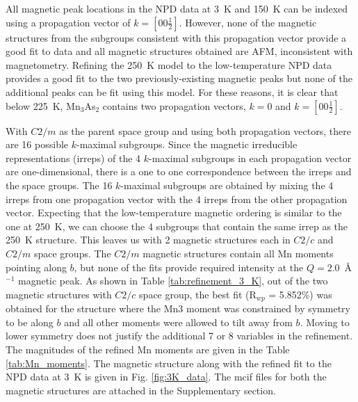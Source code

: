 \documentclass[letterpaper,10pt,doublespacing,edeposit]{uiucthesis2020}
\begin{document}
\begin{mainmatter}
All magnetic peak locations in the NPD data at 3~K and 150~K can be indexed using a propagation vector of $k = [00\frac{1}{2}]$. However, none of the magnetic structures from the subgroups consistent with this propagation vector provide a good fit to data and all magnetic structures obtained are AFM, inconsistent with magnetometry. Refining the 250~K model to the low-temperature NPD data provides a good fit to the two previously-existing magnetic peaks but none of the additional peaks can be fit using this model. For these reasons, it is clear that below 225~K, Mn$_3$As$_2$ contains two propagation vectors, $k = 0$ and $k = [00\frac{1}{2}]$. 


With $C2/m$ as the parent space group and using both propagation vectors, there are 16 possible $k$-maximal subgroups. 
Since the magnetic irreducible representations (irreps) of the 4 $k$-maximal subgroups in each propagation vector are one-dimensional, there is a one to one correspondence between the irreps and the space groups. The 16 $k$-maximal subgroups are obtained by mixing the 4 irreps from one propagation vector with the 4 irreps from the other propagation vector.
Expecting that the low-temperature magnetic ordering is similar to the one at 250~K, we can choose the 4 subgroups that contain the same irrep as the 250~K structure. 
This leaves us with 2 magnetic structures each in $C2/c$ and $C2/m$ space groups. The $C2/m$  magnetic structures contain all Mn moments pointing along $b$, but none of the fits provide required intensity at the $Q = 2.0$~\AA$^{-1}$ magnetic peak. As shown in Table \ref{tab:refinement_3_K}, out of the two magnetic structures with $C2/c$ space group, the best fit (R$_{wp}$ = 5.852\%) was obtained for the structure where the Mn3 moment was constrained by symmetry to be along $b$ and all other moments were allowed to tilt away from $b$. Moving to lower symmetry does not justify the additional 7 or 8 variables in the refinement. The magnitudes of the refined Mn moments are given in the Table \ref{tab:Mn_moments}. The magnetic structure along with the refined fit to the NPD data at 3~K is given in Fig. \ref{fig:3K_data}. The mcif files for both the magnetic structures are attached in the Supplementary section.


\end{mainmatter}
\end{document}
